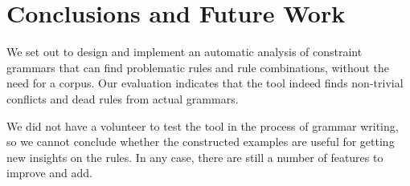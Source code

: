 







\section{Conclusions and Future Work}
\label{sec:conclusion}

We set out to design and implement an automatic analysis of constraint grammars that can find problematic rules and rule combinations, without the need for a corpus.
Our evaluation indicates that the tool indeed finds non-trivial conflicts and dead rules
from actual grammars. 

We did not have a volunteer to test the tool in
the process of grammar writing, so we cannot conclude whether the
constructed examples are useful for getting new insights on the rules.
In any case, there are still a number of features to improve and add.

